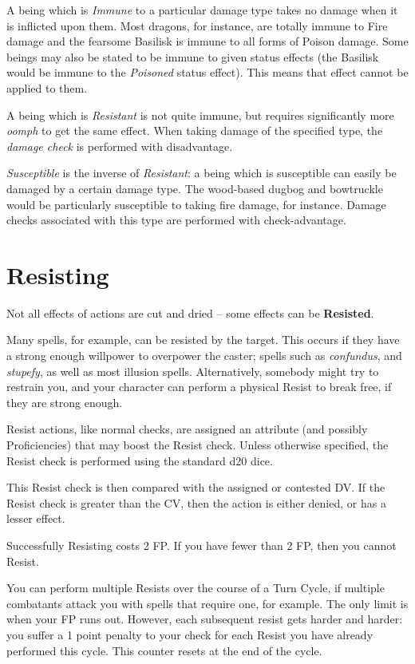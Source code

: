 A being which is {\it Immune} to a particular damage type takes no damage when it is inflicted upon them. Most dragons, for instance, are totally immune to Fire damage and the fearsome Basilisk is immune to all forms of Poison damage. Some beings may also be stated to be immune to given status effects (the Basilisk would be immune to the {\it Poisoned} status effect). This means that effect cannot be applied to them. 

A being which is {\it Resistant} is not quite immune, but requires significantly more {\it oomph} to get the same effect. When taking damage of the specified type, the {\it damage check} is performed with disadvantage. 

{\it Susceptible} is the inverse of {\it Resistant}: a being which is susceptible can easily be damaged by a certain damage type. The wood-based dugbog and bowtruckle would be particularly susceptible to taking fire damage, for instance. Damage checks associated with this type are performed with check-advantage. 

\section{Resisting}

Not all effects of actions are cut and dried -- some effects can be {\bf Resisted}. 

Many spells, for example, can be resisted by the target. This occurs if they have a strong enough willpower to overpower the caster; spells such as {\it confundus}, and {\it stupefy}, as well as most illusion spells. Alternatively, somebody might try to restrain you, and your character can perform a physical Resist to break free, if they are strong enough. 

Resist actions, like normal checks, are assigned an attribute (and possibly Proficiencies) that may boost the Resist check. Unless otherwise specified, the Resist check is performed using the standard d20 dice. 

This Resist check is then compared with the assigned or contested DV. If the Resist check is greater than the CV, then the action is either denied, or has a lesser effect. 

Successfully Resisting costs 2 FP. If you have fewer than 2 FP, then you cannot Resist.

You can perform multiple Resists over the course of a Turn Cycle, if multiple combatants attack you with spells that require one, for example. The only limit is when your FP runs out. However, each subsequent resist gets harder and harder: you suffer a 1 point penalty to your check for each Resist you have already performed this cycle. This counter resets at the end of the cycle.

